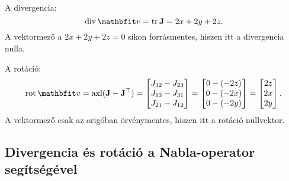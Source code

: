 \documentclass{szb-solution}
\begin{document}
A divergencia:
$$
  \Div \rvec v = \operatorname{tr} \rmat J = 2x + 2y + 2z
  \text.
$$
A vektormező a $2x + 2y + 2z = 0$ síkon forrásmentes, hiszen itt a divergencia
nulla.

A rotáció:
$$
  \rot \rvec v = \operatorname{axl}(\rmat J - \rmat J^\T) = \begin{bmatrix}
    J_{32} - J_{23} \\
    J_{13} - J_{31} \\
    J_{21} - J_{12}
  \end{bmatrix} = \begin{bmatrix}
    0 - (-2z) \\
    0 - (-2x) \\
    0 - (-2y)
  \end{bmatrix} = \begin{bmatrix}
    2z \\ 2x \\ 2y
  \end{bmatrix}
  \text.
$$
A vektormező csak az origóban örvénymentes, hiszen itt a rotáció nullvektor.

\subsection{Divergencia és rotáció a Nabla-operator segítségével}
\end{document}

